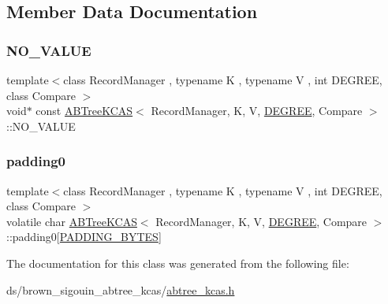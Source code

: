 \subsection{Member Data Documentation}
\mbox{\label{classABTreeKCAS_aa5896145408e8cc48a7dd620741a8f5d}} 
\subsubsection{\texorpdfstring{N\+O\+\_\+\+V\+A\+L\+UE}{NO\_VALUE}}
{\footnotesize\ttfamily template$<$class Record\+Manager , typename K , typename V , int D\+E\+G\+R\+EE, class Compare $>$ \\
void$\ast$ const \hyperlink{classABTreeKCAS}{A\+B\+Tree\+K\+C\+AS}$<$ Record\+Manager, K, V, \hyperlink{brown__sigouin__abtree__kcas_2adapter_8h_a5d88b17d70c985f2f2b8e987037fd6dd}{D\+E\+G\+R\+EE}, Compare $>$\+::N\+O\+\_\+\+V\+A\+L\+UE}

\mbox{\label{classABTreeKCAS_ab9a66f57523ef0e2fa3f0956b648b820}} 
\subsubsection{\texorpdfstring{padding0}{padding0}}
{\footnotesize\ttfamily template$<$class Record\+Manager , typename K , typename V , int D\+E\+G\+R\+EE, class Compare $>$ \\
volatile char \hyperlink{classABTreeKCAS}{A\+B\+Tree\+K\+C\+AS}$<$ Record\+Manager, K, V, \hyperlink{brown__sigouin__abtree__kcas_2adapter_8h_a5d88b17d70c985f2f2b8e987037fd6dd}{D\+E\+G\+R\+EE}, Compare $>$\+::padding0\mbox{[}\hyperlink{skiplist_8h_a88585c3499d8f870798f19b81a3f41c9}{P\+A\+D\+D\+I\+N\+G\+\_\+\+B\+Y\+T\+ES}\mbox{]}}



The documentation for this class was generated from the following file\+:\begin{DoxyCompactItemize}
\item 
ds/brown\+\_\+sigouin\+\_\+abtree\+\_\+kcas/\hyperlink{abtree__kcas_8h}{abtree\+\_\+kcas.\+h}\end{DoxyCompactItemize}
